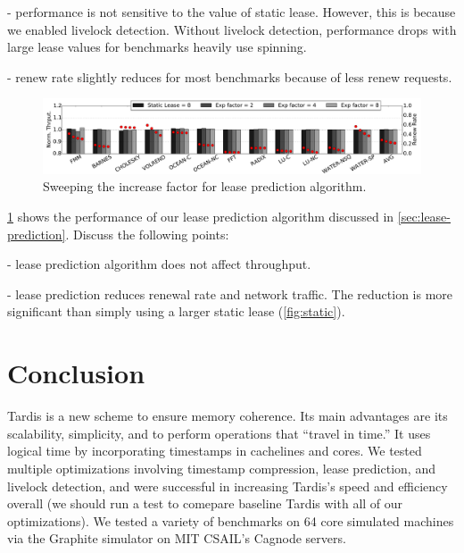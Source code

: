 \documentclass[12pt]{article}
\begin{document}
- performance is not sensitive to the value of static lease. However, 
  this is because we enabled livelock detection. Without livelock 
  detection, performance drops with large lease values for benchmarks 
  heavily use spinning.

- renew rate slightly reduces for most benchmarks because of less 
  renew requests.

\begin{figure}
	\centering
	\includegraphics[width=0.95\columnwidth]{figs/exp.pdf}
	\caption{ Sweeping the increase factor for lease prediction 
	algorithm.}
	\label{fig:exp}
\end{figure}

\cref{fig:exp} shows the performance of our lease prediction algorithm 
discussed in \cref{sec:lease-prediction}. Discuss the following 
points:

- lease prediction algorithm does not affect throughput.

- lease prediction reduces renewal rate and network traffic. The 
  reduction is more significant than simply using a larger static 
  lease (\cref{fig:static}).



\section{Conclusion}
	Tardis is a new scheme to ensure memory coherence. Its main advantages are its scalability, simplicity, and to perform operations that “travel in time.” It uses logical time by incorporating timestamps in cachelines and cores. We tested multiple optimizations involving timestamp compression, lease prediction, and livelock detection, and were successful in increasing Tardis’s speed and efficiency overall (we should run a test to comepare baseline Tardis with all of our optimizations). We tested a variety of benchmarks on 64 core simulated machines via the Graphite simulator on MIT CSAIL’s Cagnode servers.

{
	
	
}
\end{document}
